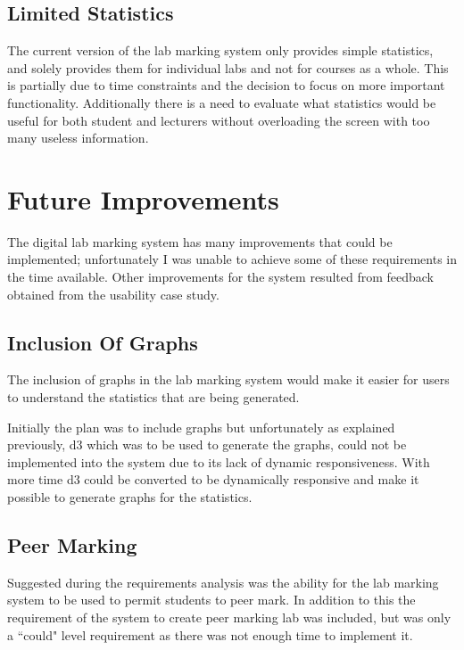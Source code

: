 \documentclass[11pt]{report}
\begin{document}
\subsection{Limited Statistics}

The current version of the lab marking system only provides simple statistics, and solely provides them for individual labs and not for courses as a whole. This is partially due to time constraints and the decision to focus on more important functionality. Additionally there is a need to evaluate what statistics would be useful for both student and lecturers without overloading the screen with too many useless information. 



\section{Future Improvements}
The digital lab marking system has many improvements that could be implemented; unfortunately I was unable to achieve some of these requirements in the time available. Other improvements for the system resulted from feedback obtained from the usability case study. 

\subsection{Inclusion Of Graphs}

The inclusion of graphs in the lab marking system would make it easier for users to understand the statistics that are being generated.  

Initially the plan was to include graphs but unfortunately as explained previously, d3 which was to be used to generate the graphs, could not be implemented into the system due to its lack of dynamic responsiveness. With more time d3 could be converted to be dynamically responsive and make it possible to generate graphs for the statistics.

\subsection{Peer Marking}

Suggested during the requirements analysis was the ability for the lab marking system to be used to permit students to peer mark. In addition to this the requirement of the system to create peer marking lab was included, but was only a ``could" level requirement as there was not enough time to implement it.
\end{document}
